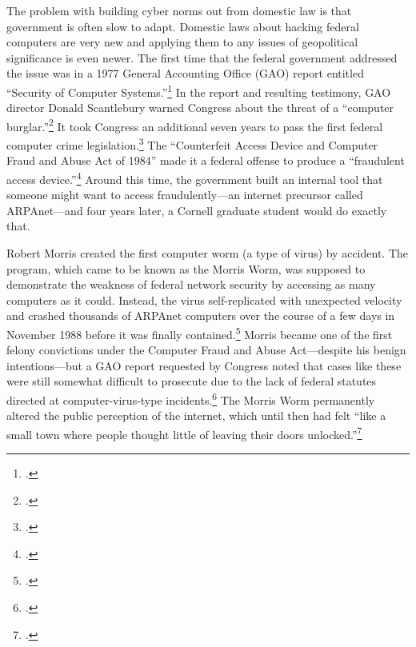 \documentclass{memoir}
\begin{document}
\begin{refsegment}
The problem with building cyber norms out from domestic law is that government is often slow to adapt. Domestic laws about hacking federal computers are very new and applying them to any issues of geopolitical significance is even newer. The first time that the federal government addressed the issue was in a 1977 General Accounting Office (GAO) report entitled ``Security of Computer Systems.''\footcite{washington_post_staff_timeline_2003} In the report and resulting testimony, GAO director Donald Scantlebury warned Congress about the threat of a ``computer burglar.''\footcite{u.s._government_accounting_office_security_1977} It took Congress an additional seven years to pass the first federal computer crime legislation.\footcite[The later bill cited here, the Computer Security Act of 1987, describes the 1984 bill as being the first federal legislation in this area.]{glickman_computer_1988} The ``Counterfeit Access Device and Computer Fraud and Abuse Act of 1984'' made it a federal offense to produce a ``fraudulent access device.''\footcite{hughes_access_1984} Around this time, the government built an internal tool that someone might want to access fraudulently---an internet precursor called ARPAnet---and four years later, a Cornell graduate student would do exactly that.

Robert Morris created the first computer worm (a type of virus) by accident. The program, which came to be known as the Morris Worm, was supposed to demonstrate the weakness of federal network security by accessing as many computers as it could. Instead, the virus self-replicated with unexpected velocity and crashed thousands of ARPAnet computers over the course of a few days in November 1988 before it was finally contained.\footcite[This source, a master's thesis for the USAF Air University, makes the dramatic and completely unsubstantiated claim that the Morris worm infected half of of ARPAnet's 88,000 computers. The more popular (and plausible) claim is that of the roughly 60,000 ARPAnet-connected computers, the worm infected 10\% of them, though that number is not particularly well substantiated either.]{moore_conception_2014} Morris became one of the first felony convictions under the Computer Fraud and Abuse Act---despite his benign intentions---but a GAO report requested by Congress noted that cases like these were still somewhat difficult to prosecute due to the lack of federal statutes directed at computer-virus-type incidents.\footcite{u._s._government_accounting_office_computer_1989} The Morris Worm permanently altered the public perception of the internet, which until then had felt ``like a small town where people thought little of leaving their doors unlocked.''\footcite{lee_how_2013}


\end{refsegment}
\end{document}
